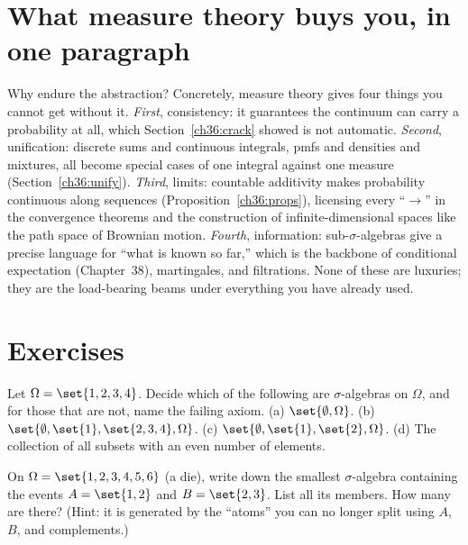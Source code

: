 \section{What measure theory buys you, in one paragraph}
\label{ch36:payoff}

Why endure the abstraction? Concretely, measure theory gives four things you cannot
get without it. \emph{First}, consistency: it guarantees the continuum can carry a
probability at all, which Section~\ref{ch36:crack} showed is not automatic.
\emph{Second}, unification: discrete sums and continuous integrals, pmfs and
densities and mixtures, all become special cases of one integral against one
measure (Section~\ref{ch36:unify}). \emph{Third}, limits: countable additivity
makes probability continuous along sequences (Proposition~\ref{ch36:props}),
licensing every ``$\to$'' in the convergence theorems and the construction of
infinite-dimensional spaces like the path space of Brownian motion.
\emph{Fourth}, information: sub-$\sigma$-algebras give a precise language for
``what is known so far,'' which is the backbone of conditional expectation
(Chapter~38), martingales, and filtrations. None of these are luxuries; they are
the load-bearing beams under everything you have already used.

\section*{Exercises}

\begin{exercise}
\label{ch36:ex-axioms}
Let $\Omega = \set{1,2,3,4}$. Decide which of the following are
$\sigma$-algebras on $\Omega$, and for those that are not, name the failing axiom.
(a) $\set{\emptyset, \Omega}$.
(b) $\set{\emptyset, \set{1}, \set{2,3,4}, \Omega}$.
(c) $\set{\emptyset, \set{1}, \set{2}, \Omega}$.
(d) The collection of all subsets with an even number of elements.
\end{exercise}

\begin{exercise}
\label{ch36:ex-generated}
On $\Omega = \set{1,2,3,4,5,6}$ (a die), write down the smallest
$\sigma$-algebra containing the events $A = \set{1,2}$ and $B = \set{2,3}$. List
all its members. How many are there? (Hint: it is generated by the ``atoms'' you
can no longer split using $A$, $B$, and complements.)
\end{exercise}

